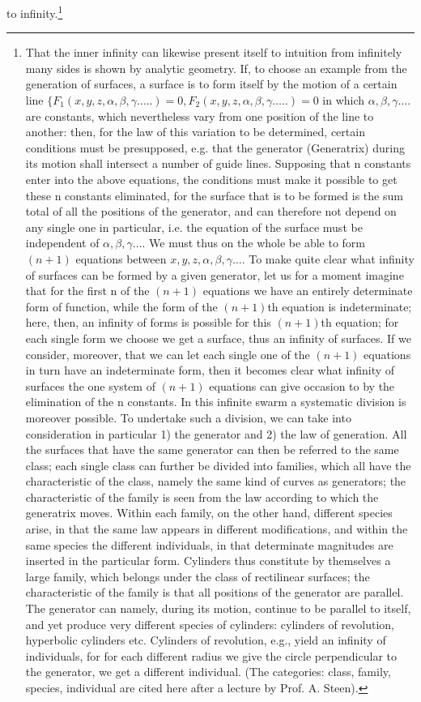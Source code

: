 \documentclass[12pt,a4paper,openany]{book}
\begin{document}
to infinity.\footnote[1]{That the inner infinity can likewise present itself to intuition from infinitely many sides is shown by analytic geometry. If, to choose an example from the generation of surfaces, a surface is to form itself by the motion of a certain line $\{F_{1}(x,y,z,\alpha,\beta,\gamma\ldots..)=0, F_{2}(x,y,z,\alpha,\beta,\gamma\ldots..)=0$ in which $\alpha,\beta,\gamma\ldots.$ are constants, which nevertheless vary from one position of the line to another: then, for the law of this variation to be determined, certain conditions must be presupposed, e.g. that the generator (Generatrix) during its motion shall intersect a number of guide lines. Supposing that n constants enter into the above equations, the conditions must make it possible to get these n constants eliminated, for the surface that is to be formed is the sum total of all the positions of the generator, and can therefore not depend on any single one in particular, i.e. the equation of the surface must be independent of $\alpha,\beta,\gamma\ldots.$ We must thus on the whole be able to form $(n+1)$ equations between $x,y,z,\alpha,\beta,\gamma\ldots.$ To make quite clear what infinity of surfaces can be formed by a given generator, let us for a moment imagine that for the first n of the $(n+1)$ equations we have an entirely determinate form of function, while the form of the $(n+1)$th equation is indeterminate; here, then, an infinity of forms is possible for this $(n+1)$th equation; for each single form we choose we get a surface, thus an infinity of surfaces. If we consider, moreover, that we can let each single one of the $(n+1)$ equations in turn have an indeterminate form, then it becomes clear what infinity of surfaces the one system of $(n+1)$ equations can give occasion to by the elimination of the n constants. In this infinite swarm a systematic division is moreover possible. To undertake such a division, we can take into consideration in particular 1) the generator and 2) the law of generation. All the surfaces that have the same generator can then be referred to the same class; each single class can further be divided into families, which all have the characteristic of the class, namely the same kind of curves as generators; the characteristic of the family is seen from the law according to which the generatrix moves. Within each family, on the other hand, different species arise, in that the same law appears in different modifications, and within the same species the different individuals, in that determinate magnitudes are inserted in the particular form. Cylinders thus constitute by themselves a large family, which belongs under the class of rectilinear surfaces; the characteristic of the family is that all positions of the generator are parallel. The generator can namely, during its motion, continue to be parallel to itself, and yet produce very different species of cylinders: cylinders of revolution, hyperbolic cylinders etc. Cylinders of revolution, e.g., yield an infinity of individuals, for for each different radius we give the circle perpendicular to the generator, we get a different individual. (The categories: class, family, species, individual are cited here after a lecture by Prof. A. Steen).}
\end{document}
